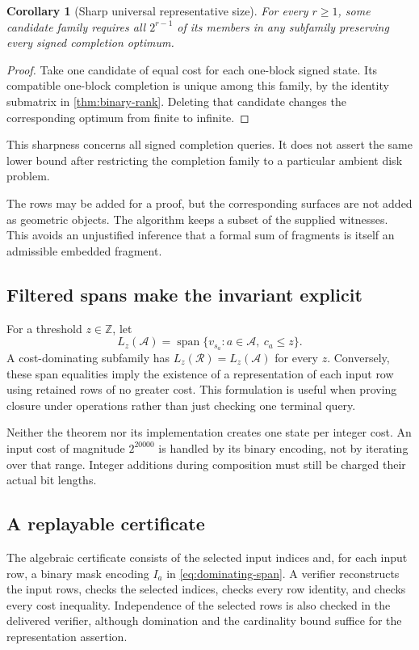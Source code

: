 \documentclass[11pt,letterpaper]{article}
\newtheorem{corollary}[theorem]{Corollary}
\theoremstyle{definition}
\newcommand{\Z}{\mathbb Z}
\begin{document}
\begin{corollary}[Sharp universal representative size]\label{cor:sharp-size}
For every $r\ge1$, some candidate family requires all $2^{r-1}$ of its members in any subfamily preserving every signed completion optimum.
\end{corollary}
\begin{proof}
Take one candidate of equal cost for each one-block signed state. Its compatible one-block completion is unique among this family, by the identity submatrix in \cref{thm:binary-rank}. Deleting that candidate changes the corresponding optimum from finite to infinite.
\end{proof}
This sharpness concerns all signed completion queries. It does not assert the same lower bound after restricting the completion family to a particular ambient disk problem.

The rows may be added for a proof, but the corresponding surfaces are not added as geometric objects. The algorithm keeps a subset of the supplied witnesses. This avoids an unjustified inference that a formal sum of fragments is itself an admissible embedded fragment.

\subsection{Filtered spans make the invariant explicit}
For a threshold $z\in\Z$, let
\[
 L_z(\mathcal A)=\operatorname{span}\{v_{s_a}:a\in\mathcal A,\ c_a\le z\}.
\]
A cost-dominating subfamily has $L_z(\mathcal R)=L_z(\mathcal A)$ for every $z$. Conversely, these span equalities imply the existence of a representation of each input row using retained rows of no greater cost. This formulation is useful when proving closure under operations rather than just checking one terminal query.

Neither the theorem nor its implementation creates one state per integer cost. An input cost of magnitude $2^{20000}$ is handled by its binary encoding, not by iterating over that range. Integer additions during composition must still be charged their actual bit lengths.

\subsection{A replayable certificate}
The algebraic certificate consists of the selected input indices and, for each input row, a binary mask encoding $I_a$ in \eqref{eq:dominating-span}. A verifier reconstructs the input rows, checks the selected indices, checks every row identity, and checks every cost inequality. Independence of the selected rows is also checked in the delivered verifier, although domination and the cardinality bound suffice for the representation assertion.
\end{document}
